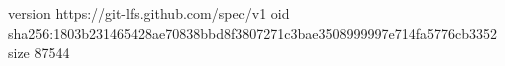version https://git-lfs.github.com/spec/v1
oid sha256:1803b231465428ae70838bbd8f3807271c3bae3508999997e714fa5776cb3352
size 87544
